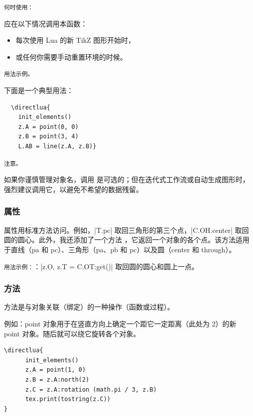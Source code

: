 \medskip
\texttt{何时使用：}

应在以下情况调用本函数：
\begin{itemize}
  \item 每次使用 Lua 的新 TikZ 图形开始时，
  \item 或任何你需要手动重置环境的时候。
\end{itemize}

\medskip
\texttt{用法示例。}

下面是一个典型用法：

  \begin{verbatim}
  \directlua{
    init_elements()
    z.A = point(0, 0)
    z.B = point(3, 4)
    L.AB = line(z.A, z.B)}
  \end{verbatim}


\medskip
\texttt{注意。}

如果你谨慎管理对象名，调用  是可选的；但在迭代式工作流或自动生成图形时，强烈建议调用它，以避免不希望的数据残留。

\subsubsection{属性}
 \label{ssub:attributes}

属性用标准方法访问。例如，|T.pc| 取回三角形的第三个点，|C.OH.center| 取回圆的圆心。此外，我还添加了一个方法 ，它返回一个对象的各个点。该方法适用于直线（pa 和 pc）、三角形（pa、pb 和 pc）以及圆（center 和 through）。

\vspace{1em}

  \texttt{用法示例：}：|z.O, z.T = C.OT:get()| 取回圆的圆心和圆上一点。

\subsubsection{方法}
\label{ssub:methods}

方法是与对象关联（绑定）的一种操作（函数或过程）。

例如：point 对象用于在竖直方向上确定一个距它一定距离（此处为 2）的新 point 对象。随后就可以绕它旋转各个对象。

\begin{mbox}{}
\begin{verbatim}
\directlua{
      init_elements()
      z.A = point(1, 0)
      z.B = z.A:north(2)
      z.C = z.A:rotation (math.pi / 3, z.B)
      tex.print(tostring(z.C))
}
\end{verbatim}
\end{mbox}

\endinput